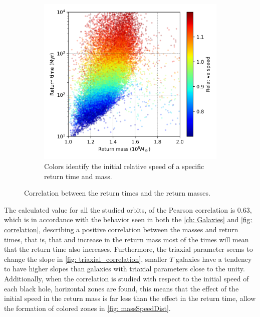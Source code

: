 \begin{figure}[h]
\begin{subfigure}[b]{0.49\textwidth}
			\includegraphics[width = \textwidth]{"../Files/Week 13/correlation_speed"}
			\caption{Colors identify the initial relative speed of a specific return time and mass.}
		\end{subfigure}
		\caption{Correlation between the return times and the return masses.}
		\label{fig: speed_correlation}
	\end{figure}
	
	The calculated value for all the studied orbits, of the Pearson correlation is 0.63, which is in accordance with the behavior seen in both the \autoref{ch: Galaxies} and \autoref{fig: correlation}, describing a positive correlation between the masses and return times, that is, that and increase in the return mass most of the times will mean that the return time also increases. Furthermore, the triaxial parameter seems to change the slope in \autoref{fig: triaxial_correlation}, smaller $T$ galaxies have a tendency to have higher slopes than galaxies with triaxial parameters close to the unity. Additionally, when the correlation is studied with respect to the initial speed of each black hole, horizontal zones are found, this means that the effect of the initial speed in the return mass is far less than the effect in the return time, allow the formation of colored zones in \autoref{fig: massSpeedDist}. 
	
